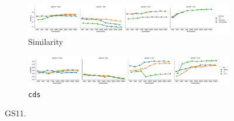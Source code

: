 \begin{figure}
  \centering

  \begin{subfigure}[t]{\textwidth}
    \includegraphics[width=1.1\textwidth]{supplement/figures/gs11-interaction-similarity}

  \caption{Similarity}
  \label{fig:gs11-similarity}
  \end{subfigure}

  \begin{subfigure}[t]{\textwidth}
    \includegraphics[width=1.1\textwidth]{supplement/figures/gs11-interaction-cds}

  \caption{\texttt{cds}}
  \label{fig:gs11-cds}
  \end{subfigure}

  \caption{GS11.}
\end{figure}
